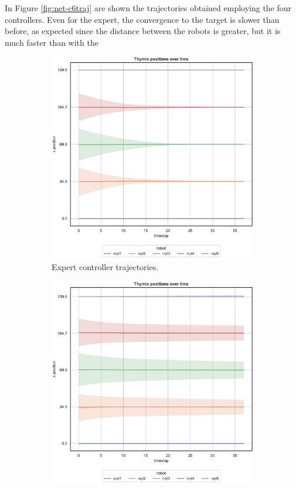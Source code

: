 In Figure \ref{fig:net-c6traj} are shown the trajectories obtained employing the 
four controllers. Even for the expert, the convergence to the target is slower than 
before, as expected since the distance between the robots is greater, but it is 
much faster than with the
\begin{figure}[!htb]
	\begin{center}
		\begin{subfigure}[h]{0.49\textwidth}
			\centering
			\includegraphics[width=.92\textwidth]{contents/images/net-d6/position-overtime-omniscient}%
			\caption{Expert controller trajectories.}
		\end{subfigure}
		\hfill
		\begin{subfigure}[h]{0.49\textwidth}
			\centering
			\includegraphics[width=.92\textwidth]{contents/images/net-d6/position-overtime-learned_distributed}

\end{subfigure}
\end{center}
\end{figure}
